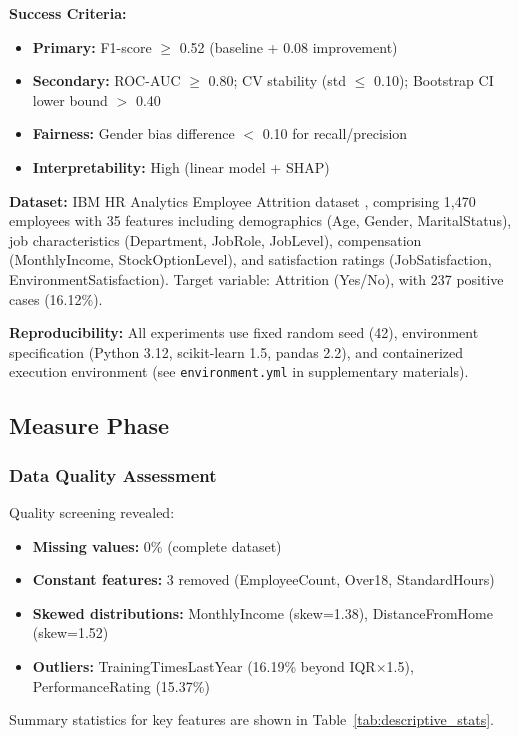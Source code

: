\documentclass[conference]{IEEEtran}
\begin{document}
\textbf{Success Criteria:}
\begin{itemize}
    \item \textbf{Primary:} F1-score $\geq$ 0.52 (baseline + 0.08 improvement)
    \item \textbf{Secondary:} ROC-AUC $\geq$ 0.80; CV stability (std $\leq$ 0.10); Bootstrap CI lower bound $>$ 0.40
    \item \textbf{Fairness:} Gender bias difference $<$ 0.10 for recall/precision
    \item \textbf{Interpretability:} High (linear model + SHAP)
\end{itemize}

\textbf{Dataset:} IBM HR Analytics Employee Attrition dataset \cite{ibm_hr_dataset}, comprising 1,470 employees with 35 features including demographics (Age, Gender, MaritalStatus), job characteristics (Department, JobRole, JobLevel), compensation (MonthlyIncome, StockOptionLevel), and satisfaction ratings (JobSatisfaction, EnvironmentSatisfaction). Target variable: Attrition (Yes/No), with 237 positive cases (16.12\%).

\textbf{Reproducibility:} All experiments use fixed random seed (42), environment specification (Python 3.12, scikit-learn 1.5, pandas 2.2), and containerized execution environment (see \texttt{environment.yml} in supplementary materials).

\subsection{Measure Phase}

\subsubsection{Data Quality Assessment}

Quality screening revealed:
\begin{itemize}
    \item \textbf{Missing values:} 0\% (complete dataset)
    \item \textbf{Constant features:} 3 removed (EmployeeCount, Over18, StandardHours)
    \item \textbf{Skewed distributions:} MonthlyIncome (skew=1.38), DistanceFromHome (skew=1.52)
    \item \textbf{Outliers:} TrainingTimesLastYear (16.19\% beyond IQR$\times$1.5), PerformanceRating (15.37\%)
\end{itemize}

Summary statistics for key features are shown in Table~\ref{tab:descriptive_stats}.
\end{document}
